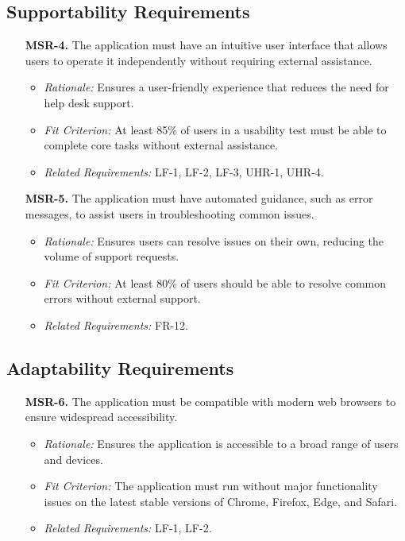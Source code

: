 \documentclass[12pt]{article}
\begin{document}
\subsection{Supportability Requirements}
\begin{enumerate}
  \item[\textbf{MSR-4.}] 
  The application must have an intuitive user interface that allows users to 
  operate it independently without requiring external assistance.
  \begin{itemize}
    \item \textit{Rationale:} Ensures a user-friendly experience that reduces 
    the need for help desk support.
    \item \textit{Fit Criterion:} At least 85\% of users in a usability test 
    must be able to complete core tasks without external assistance.
    \item \textit{Related Requirements:} LF-1, LF-2, LF-3, UHR-1, UHR-4.
  \end{itemize}

  \item[\textbf{MSR-5.}] The application must have automated guidance, such as 
  error messages, to assist users in troubleshooting common issues.
  \begin{itemize}
    \item \textit{Rationale:} Ensures users can resolve issues on their own, 
    reducing the volume of support requests.
    \item \textit{Fit Criterion:} At least 80\% of users should be able to 
    resolve common errors without external support.
    \item \textit{Related Requirements:} FR-12.
  \end{itemize}
\end{enumerate}

\subsection{Adaptability Requirements}
\begin{enumerate}
  \item[\textbf{MSR-6.}] The application must be compatible with modern web 
  browsers to ensure widespread accessibility.
  \begin{itemize}
    \item \textit{Rationale:} Ensures the application is accessible to a broad 
    range of users and devices.
    \item \textit{Fit Criterion:} The application must run without major 
    functionality issues on the latest stable versions of Chrome, Firefox, Edge, 
    and Safari.
    \item \textit{Related Requirements:} LF-1, LF-2.
  \end{itemize}
\end{enumerate}
\end{document}
